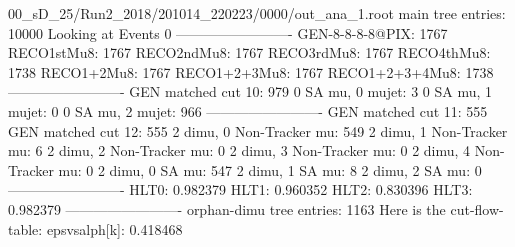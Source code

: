 00_sD_25/Run2_2018/201014_220223/0000/out_ana_1.root
main tree entries: 10000
Looking at Events 0
-------------------------
GEN-8-8-8-8@PIX: 1767
RECO1stMu8: 1767
RECO2ndMu8: 1767
RECO3rdMu8: 1767
RECO4thMu8: 1738
RECO1+2Mu8: 1767
RECO1+2+3Mu8: 1767
RECO1+2+3+4Mu8: 1738
-------------------------
GEN matched cut 10: 979
0 SA mu, 0 mujet: 3
0 SA mu, 1 mujet: 0
0 SA mu, 2 mujet: 966
-------------------------
GEN matched cut 11: 555
GEN matched cut 12: 555
2 dimu, 0 Non-Tracker mu: 549
2 dimu, 1 Non-Tracker mu: 6
2 dimu, 2 Non-Tracker mu: 0
2 dimu, 3 Non-Tracker mu: 0
2 dimu, 4 Non-Tracker mu: 0
2 dimu, 0 SA mu: 547
2 dimu, 1 SA mu: 8
2 dimu, 2 SA mu: 0
-------------------------
HLT0: 0.982379
HLT1: 0.960352
HLT2: 0.830396
HLT3: 0.982379
-------------------------
orphan-dimu tree entries: 1163
Here is the cut-flow-table:
epsvsalph[k]: 0.418468
        
